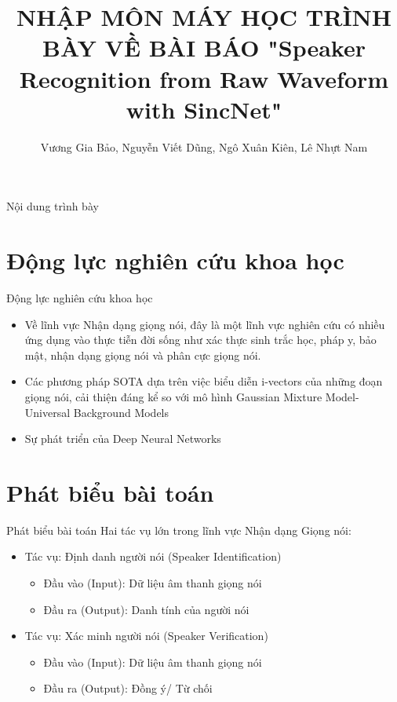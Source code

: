 \documentclass[11pt]{beamer}
\author{Vương Gia Bảo, Nguyễn Viết Dũng, Ngô Xuân Kiên, Lê Nhựt Nam}
\title{NHẬP MÔN MÁY HỌC \newline  TRÌNH BÀY VỀ BÀI BÁO "Speaker Recognition from Raw Waveform with SincNet"}
\institute{Đại học Khoa học Tự nhiên, Đại học Quốc gia TP HCM}
\begin{document}
\begin{frame}
\titlepage
\end{frame}

\begin{frame}{Nội dung trình bày}
\tableofcontents
\end{frame}


\section{Động lực nghiên cứu khoa học}
\begin{frame}{Động lực nghiên cứu khoa học}
	\begin{itemize}
		\item Về lĩnh vực Nhận dạng giọng nói, đây là một lĩnh vực nghiên cứu có nhiều ứng dụng vào thực tiễn đời sống như xác thực sinh trắc học, pháp y, bảo mật, nhận dạng giọng nói và phân cực giọng nói.
		\item Các phương pháp SOTA dựa trên việc biểu diễn i-vectors của những đoạn
		giọng nói, cải thiện đáng kể so với mô hình Gaussian Mixture Model-Universal Background Models
		\item Sự phát triển của Deep Neural Networks
	\end{itemize}
\end{frame}

\section{Phát biểu bài toán}
\begin{frame}{Phát biểu bài toán}
	Hai tác vụ lớn trong lĩnh vực Nhận dạng Giọng nói:\newline
	\begin{itemize}
		\item Tác vụ: Định danh người nói (Speaker Identification)
		\begin{itemize}
			\item Đầu vào (Input): Dữ liệu âm thanh giọng nói
			\item Đầu ra (Output): Danh tính của người nói
		\end{itemize}
		\item 	Tác vụ: Xác minh người nói (Speaker Verification)
		\begin{itemize}
			\item Đầu vào (Input): Dữ liệu âm thanh giọng nói
			\item Đầu ra (Output): Đồng ý/ Từ chối
		\end{itemize}
	\end{itemize}
\end{frame}
\end{document}
